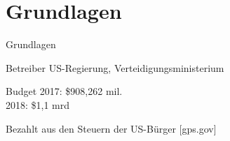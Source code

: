 \section{Grundlagen}
\begin{frame}{Grundlagen}
    \begin{block}{Betreiber}
        US-Regierung, Verteidigungsministerium
    \end{block}
    \begin{block}{Budget}
        2017: \$908,262 mil.\\
        2018: \$1,1 mrd
    \end{block}
    Bezahlt aus den Steuern der US-Bürger {\small [gps.gov]}
\end{frame}


